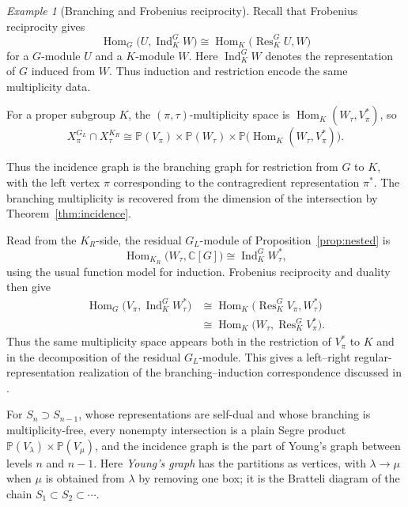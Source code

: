 \documentclass[10pt]{amsart}
\theoremstyle{remark}
\newtheorem{example}[theorem]{Example}
\DeclareMathOperator{\Hom}{Hom}
\newcommand{\PP}{\mathbb P}
\begin{document}
\begin{example}[Branching and Frobenius reciprocity]\label{ex:branching}
Recall that Frobenius reciprocity \cite{GoodmanWallach} gives
\[
 \operatorname{Hom}_G
 \bigl(U,\operatorname{Ind}_K^G W\bigr)
 \cong
 \operatorname{Hom}_K
 \bigl(\operatorname{Res}_K^G U,W\bigr)
\]
for a $G$-module $U$ and a $K$-module $W$.
Here $\operatorname{Ind}_K^G W$ denotes the representation
of $G$ induced from $W$.
Thus induction and restriction encode the same
multiplicity data.

For a proper subgroup $K$, the $(\pi,\tau)$-multiplicity space is $\Hom_K(W_\tau,V_\pi^*)$, so
\[
 X_\pi^{G_L}\cap X_\tau^{K_R}
 \cong
 \PP(V_\pi)\times\PP(W_\tau)\times
 \PP\bigl(\Hom_K(W_\tau,V_\pi^*)\bigr).
\]

Thus the incidence graph is the branching graph for
restriction from $G$ to $K$, with the left vertex $\pi$
corresponding to the contragredient representation $\pi^*$.
The branching multiplicity is recovered from the dimension
of the intersection by Theorem~\ref{thm:incidence}.

Read from the $K_R$-side, the residual $G_L$-module
of Proposition~\ref{prop:nested} is
\[
 \operatorname{Hom}_{K_R}
 \bigl(W_\tau,\mathbb{C}[G]\bigr)
 \cong
 \operatorname{Ind}_K^G W_\tau^*,
\]
using the usual function model for induction.
Frobenius reciprocity and duality then give
\[
 \begin{aligned}
 \operatorname{Hom}_G
 \bigl(V_\pi,\operatorname{Ind}_K^G W_\tau^*\bigr)
 &\cong
 \operatorname{Hom}_K
 \bigl(\operatorname{Res}_K^G V_\pi,W_\tau^*\bigr)\\
 &\cong
 \operatorname{Hom}_K
 \bigl(W_\tau,\operatorname{Res}_K^G V_\pi^*\bigr).
 \end{aligned}
\]
Thus the same multiplicity space appears both in the restriction of $V_\pi^*$ to $K$ and in
the decomposition of the residual $G_L$-module. This gives a left--right regular-representation
realization of the branching--induction correspondence discussed in
\cite[Section~3.2]{HungKang2026}.

For $S_n\supset S_{n-1}$, whose representations are self-dual and whose branching
is multiplicity-free, every nonempty intersection is a plain Segre product $\PP(V_\lambda)\times\PP(V_\mu)$,
and the incidence graph is the part of Young's graph between levels $n$ and $n-1$. Here \emph{Young's
graph} has the partitions as vertices, with $\lambda\to\mu$ when $\mu$ is obtained from $\lambda$ by removing
one box; it is the Bratteli diagram of the chain $S_1\subset S_2\subset\cdots$.
\end{example}
\end{document}

